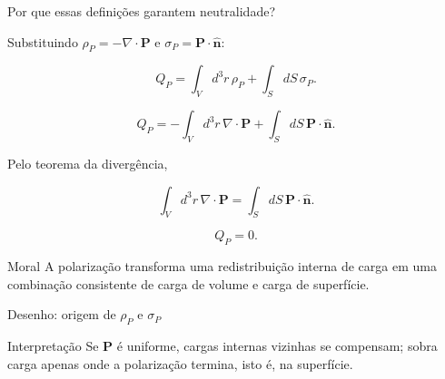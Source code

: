 \documentclass[aspectratio=169]{beamer}
\begin{document}
\begin{frame}{Por que essas definições garantem neutralidade?}

\footnotesize

Substituindo \(\rho_P=-\nabla\cdot\mathbf P\) e
\(\sigma_P=\mathbf P\cdot\hat{\mathbf n}\):

\[
Q_P
=
\int_V d^3r\,\rho_P
+
\int_S dS\,\sigma_P.
\]

\[
Q_P
=
-\int_V d^3r\,\nabla\cdot\mathbf P
+
\int_S dS\,\mathbf P\cdot\hat{\mathbf n}.
\]

Pelo teorema da divergência,

\[
\int_V d^3r\,\nabla\cdot\mathbf P
=
\int_S dS\,\mathbf P\cdot\hat{\mathbf n}.
\]

\begin{eqbox}
\begin{equation}
Q_P=0.
\end{equation}
\end{eqbox}

\begin{alertblock}{Moral}
A polarização transforma uma redistribuição interna de carga em uma combinação
consistente de carga de volume e carga de superfície.
\end{alertblock}

\end{frame}

\begin{frame}{Desenho: origem de \(\rho_P\) e \(\sigma_P\)}

\begin{center}
\end{center}

\begin{mybox}{Interpretação}
Se \(\mathbf P\) é uniforme, cargas internas vizinhas se compensam; sobra carga
apenas onde a polarização termina, isto é, na superfície.
\end{mybox}

\end{frame}
\end{document}
